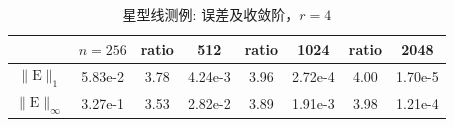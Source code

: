\documentclass[a4paper,twoside]{ctexart}
\begin{document}
  \begin{table}[htbp]
    \centering\begin{tabular}{c|ccccccc}
        \hline
         &$n=256$&ratio&512&ratio&1024&ratio&2048\\
        \hline
        $\|\mathrm{E}\|_1$&5.83e-2&3.78&4.24e-3&3.96&2.72e-4&4.00&1.70e-5\\
        \hline
        $\|\mathrm{E}\|_{\infty}$&3.27e-1&3.53&2.82e-2&3.89&1.91e-3&3.98&1.21e-4\\
        \hline
    \end{tabular}
    \caption{星型线测例: 误差及收敛阶，$r = 4$}
    \label{tab:star2}
\end{table}
\end{document}
